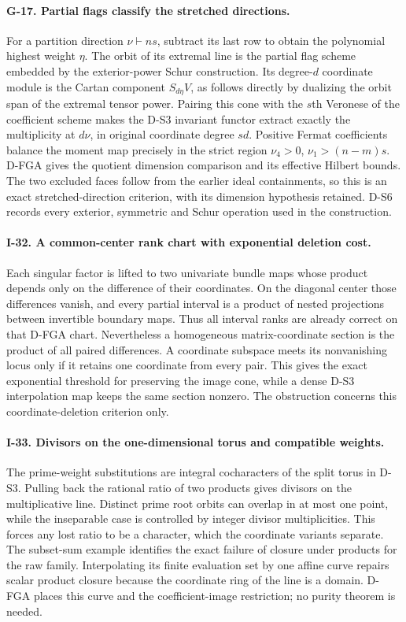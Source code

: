 \paragraph{G-17. Partial flags classify the stretched directions.}
For a partition direction $\nu\vdash ns$, subtract its last row to
obtain the polynomial highest weight $\eta$. The orbit of its extremal
line is the partial flag scheme embedded by the exterior-power Schur
construction. Its degree-$d$ coordinate module is the Cartan component
$S_{d\eta}V$, as follows directly by dualizing the orbit span of the
extremal tensor power. Pairing this cone with the $s$th Veronese of the
coefficient scheme makes the D-S3 invariant functor extract exactly
the multiplicity at $d\nu$, in original coordinate degree $sd$.
Positive Fermat coefficients balance the moment map precisely in the
strict region $\nu_4>0$, $\nu_1>(n-m)s$. D-FGA gives the quotient
dimension comparison and its effective Hilbert bounds. The two
excluded faces follow from the earlier ideal containments, so this
is an exact stretched-direction criterion, with its dimension
hypothesis retained. D-S6 records every exterior, symmetric and Schur
operation used in the construction.

\paragraph{I-32. A common-center rank chart with exponential deletion cost.}
Each singular factor is lifted to two univariate bundle maps whose
product depends only on the difference of their coordinates. On the
diagonal center those differences vanish, and every partial interval
is a product of nested projections between invertible boundary maps.
Thus all interval ranks are already correct on that D-FGA chart.
Nevertheless a homogeneous matrix-coordinate section is the product
of all paired differences. A coordinate subspace meets its nonvanishing
locus only if it retains one coordinate from every pair. This gives
the exact exponential threshold for preserving the image cone, while
a dense D-S3 interpolation map keeps the same section nonzero. The
obstruction concerns this coordinate-deletion criterion only.

\paragraph{I-33. Divisors on the one-dimensional torus and compatible weights.}
The prime-weight substitutions are integral cocharacters of the
split torus in D-S3. Pulling back the rational ratio of two products
gives divisors on the multiplicative line. Distinct prime root orbits
can overlap in at most one point, while the inseparable case is
controlled by integer divisor multiplicities. This forces any lost
ratio to be a character, which the coordinate variants separate.
The subset-sum example identifies the exact failure of closure under
products for the raw family. Interpolating its finite evaluation set
by one affine curve repairs scalar product closure because the
coordinate ring of the line is a domain. D-FGA places this curve and
the coefficient-image restriction; no purity theorem is needed.

